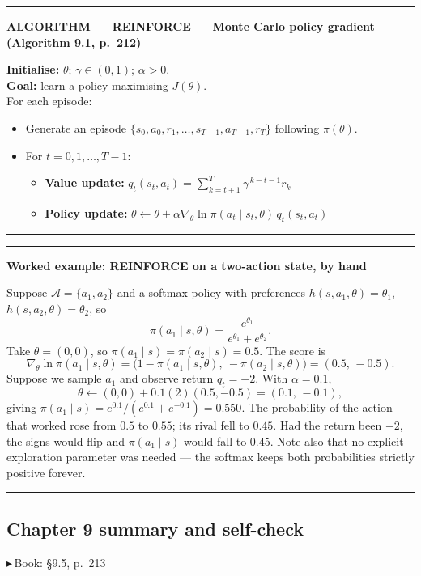 \documentclass[11pt, letterpaper]{article}
\theoremstyle{runin}
\theoremstyle{runinplain}
\theoremstyle{remark}
\newcommand{\Aspace}{\mathcal{A}}
\newcommand{\bk}[1]{{\color{bookblue}\small$\blacktriangleright$\,\textsf{Book: #1}}}
\newenvironment{algobox}[1]
  {\par\medskip\noindent\rule{\textwidth}{0.9pt}\par\nobreak\vspace{0.25em}
   \noindent\textbf{\small ALGORITHM --- #1}\par\nobreak\vspace{0.15em}
   \small}
  {\par\nobreak\vspace{0.25em}\noindent\rule{\textwidth}{0.9pt}\par\medskip}
\newenvironment{worked}[1]
  {\par\medskip\noindent\rule{\textwidth}{0.4pt}\par\nobreak\vspace{0.3em}
   \noindent\textbf{Worked example: #1}\par\nobreak\vspace{0.2em}\small}
  {\par\nobreak\vspace{0.3em}\noindent\rule{\textwidth}{0.4pt}\par\medskip}
\begin{document}
\begin{algobox}{REINFORCE --- Monte Carlo policy gradient (Algorithm 9.1, p.~212)}
\textbf{Initialise:} $\theta$; $\gamma\in(0,1)$; $\alpha>0$.\\
\textbf{Goal:} learn a policy maximising $J(\theta)$.\\
For each episode:
\begin{itemize}\itemsep0pt
  \item Generate an episode $\{s_0,a_0,r_1,\dots,s_{T-1},a_{T-1},r_T\}$ following
        $\pi(\theta)$.
  \item For $t=0,1,\dots,T-1$:
    \begin{itemize}\itemsep0pt
      \item \textbf{Value update:}
            $q_t(s_t,a_t)=\sum_{k=t+1}^{T}\gamma^{\,k-t-1}r_k$
      \item \textbf{Policy update:}
            $\theta\leftarrow\theta+\alpha\nabla_\theta\ln\pi(a_t\mid s_t,\theta)\,q_t(s_t,a_t)$
    \end{itemize}
\end{itemize}
\end{algobox}

\begin{worked}{REINFORCE on a two-action state, by hand}
Suppose $\Aspace=\{a_1,a_2\}$ and a softmax policy with preferences
$h(s,a_1,\theta)=\theta_1$, $h(s,a_2,\theta)=\theta_2$, so
\[
  \pi(a_1\mid s,\theta)=\frac{e^{\theta_1}}{e^{\theta_1}+e^{\theta_2}} .
\]
Take $\theta=(0,0)$, so $\pi(a_1\mid s)=\pi(a_2\mid s)=0.5$. The score is
\[
  \nabla_\theta\ln\pi(a_1\mid s,\theta)
  =\bigl(1-\pi(a_1\mid s,\theta),\ -\pi(a_2\mid s,\theta)\bigr)=(0.5,\,-0.5).
\]
Suppose we sample $a_1$ and observe return $q_t=+2$. With $\alpha=0.1$,
\[
  \theta\leftarrow(0,0)+0.1(2)(0.5,-0.5)=(0.1,\,-0.1),
\]
giving $\pi(a_1\mid s)=e^{0.1}/(e^{0.1}+e^{-0.1})=0.550$. The probability of the
action that worked rose from $0.5$ to $0.55$; its rival fell to $0.45$. Had the
return been $-2$, the signs would flip and $\pi(a_1\mid s)$ would fall to $0.45$.
Note also that no explicit exploration parameter was needed --- the softmax keeps
both probabilities strictly positive forever.
\end{worked}

\subsection{Chapter 9 summary and self-check}

\bk{\S9.5, p.~213}
\end{document}
